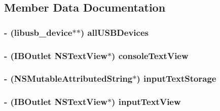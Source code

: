 \subsection{Member Data Documentation}
\hypertarget{interface_c_t_app_delegate_a9d80eb0a8fb6f9c373648cba3dbe5b26}{
\subsubsection[{all\-U\-S\-B\-Devices}]{\setlength{\rightskip}{0pt plus 5cm}-\/ (libusb\-\_\-device$\ast$$\ast$) all\-U\-S\-B\-Devices\hspace{0.3cm}{\ttfamily [protected]}}}\label{interface_c_t_app_delegate_a9d80eb0a8fb6f9c373648cba3dbe5b26}
\hypertarget{interface_c_t_app_delegate_a02680c24bf116eb7869cfe0489b2a381}{
\subsubsection[{console\-Text\-View}]{\setlength{\rightskip}{0pt plus 5cm}-\/ (I\-B\-Outlet N\-S\-Text\-View$\ast$) console\-Text\-View\hspace{0.3cm}{\ttfamily [protected]}}}\label{interface_c_t_app_delegate_a02680c24bf116eb7869cfe0489b2a381}
\hypertarget{interface_c_t_app_delegate_a267286c82789444b42d30238c62b38bc}{
\subsubsection[{input\-Text\-Storage}]{\setlength{\rightskip}{0pt plus 5cm}-\/ (N\-S\-Mutable\-Attributed\-String$\ast$) input\-Text\-Storage\hspace{0.3cm}{\ttfamily [protected]}}}\label{interface_c_t_app_delegate_a267286c82789444b42d30238c62b38bc}
\hypertarget{interface_c_t_app_delegate_abf8e0f79b36a4b23262ba2a2d29eabe7}{
\subsubsection[{input\-Text\-View}]{\setlength{\rightskip}{0pt plus 5cm}-\/ (I\-B\-Outlet N\-S\-Text\-View$\ast$) input\-Text\-View\hspace{0.3cm}{\ttfamily [protected]}}}\label{interface_c_t_app_delegate_abf8e0f79b36a4b23262ba2a2d29eabe7}
